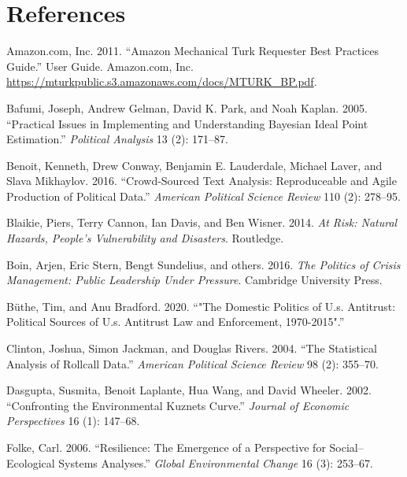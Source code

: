 \documentclass[]{article}
\begin{document}
\hypertarget{references}{%
\section*{References}\label{references}}

\hypertarget{refs}{}
\leavevmode\hypertarget{ref-MTurk2011}{}%
Amazon.com, Inc. 2011. ``Amazon Mechanical Turk Requester Best Practices Guide.'' User Guide. Amazon.com, Inc. \url{https://mturkpublic.s3.amazonaws.com/docs/MTURK_BP.pdf}.

\leavevmode\hypertarget{ref-gelman2005}{}%
Bafumi, Joseph, Andrew Gelman, David K. Park, and Noah Kaplan. 2005. ``Practical Issues in Implementing and Understanding Bayesian Ideal Point Estimation.'' \emph{Political Analysis} 13 (2): 171--87.

\leavevmode\hypertarget{ref-benoitetal2016}{}%
Benoit, Kenneth, Drew Conway, Benjamin E. Lauderdale, Michael Laver, and Slava Mikhaylov. 2016. ``Crowd-Sourced Text Analysis: Reproduceable and Agile Production of Political Data.'' \emph{American Political Science Review} 110 (2): 278--95.

\leavevmode\hypertarget{ref-blaikie2014risk}{}%
Blaikie, Piers, Terry Cannon, Ian Davis, and Ben Wisner. 2014. \emph{At Risk: Natural Hazards, People's Vulnerability and Disasters}. Routledge.

\leavevmode\hypertarget{ref-boin2016politics}{}%
Boin, Arjen, Eric Stern, Bengt Sundelius, and others. 2016. \emph{The Politics of Crisis Management: Public Leadership Under Pressure}. Cambridge University Press.

\leavevmode\hypertarget{ref-buthe2020}{}%
Büthe, Tim, and Anu Bradford. 2020. ``"The Domestic Politics of U.s. Antitrust: Political Sources of U.s. Antitrust Law and Enforcement, 1970-2015".''

\leavevmode\hypertarget{ref-jackman2004}{}%
Clinton, Joshua, Simon Jackman, and Douglas Rivers. 2004. ``The Statistical Analysis of Rollcall Data.'' \emph{American Political Science Review} 98 (2): 355--70.

\leavevmode\hypertarget{ref-dasgupta2002confronting}{}%
Dasgupta, Susmita, Benoit Laplante, Hua Wang, and David Wheeler. 2002. ``Confronting the Environmental Kuznets Curve.'' \emph{Journal of Economic Perspectives} 16 (1): 147--68.

\leavevmode\hypertarget{ref-folke2006resilience}{}%
Folke, Carl. 2006. ``Resilience: The Emergence of a Perspective for Social--Ecological Systems Analyses.'' \emph{Global Environmental Change} 16 (3): 253--67.
\end{document}
